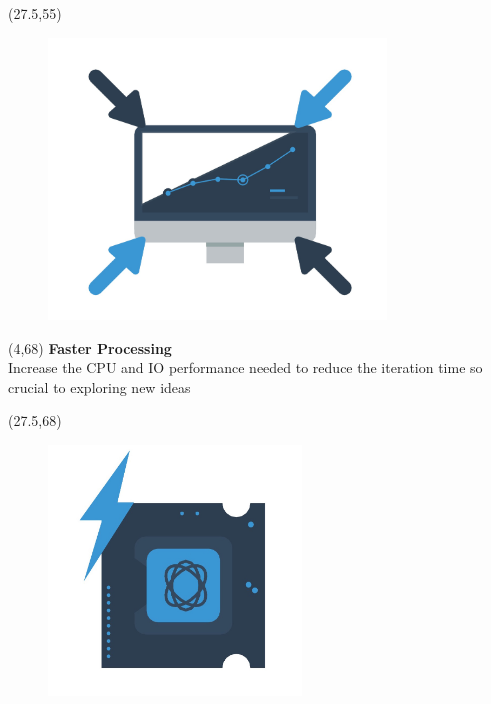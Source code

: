 \documentclass[final]{beamer}
\begin{document}
\begin{frame}{}
\begin{textblock}{12.5}(27.5,55)
\begin{figure}[tbph]
\centering
\includegraphics[width=0.8\textwidth]{collaborate.jpg}
\end{figure}
\end{textblock}


\begin{textblock}{22.5}(4,68)
\textcolor{mybluelabel}{\bf Faster Processing} \\
Increase the CPU and IO performance needed to reduce the iteration time so crucial to exploring new ideas
\end{textblock}

\begin{textblock}{12.5}(27.5,68)
\begin{figure}[tbph]
\centering
\includegraphics[width=0.6\textwidth]{faster-processing.jpg}
\end{figure}
\end{textblock}


\end{frame}
\end{document}
